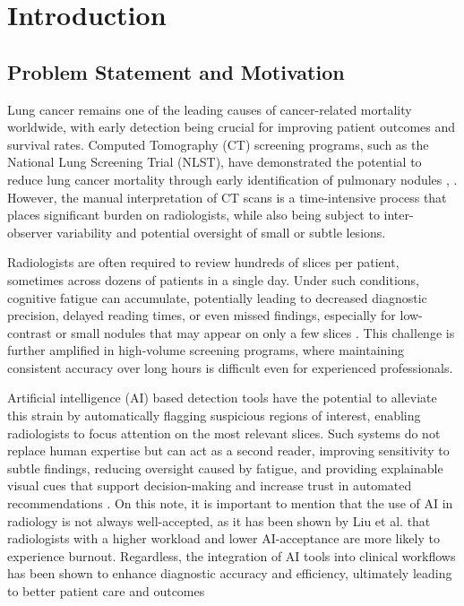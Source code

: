 \chapter{Introduction}
\label{ch:introduction}

\section{Problem Statement and Motivation}

Lung cancer remains one of the leading causes of cancer-related mortality worldwide, with early detection being crucial for improving patient outcomes and survival rates. Computed Tomography (CT) screening programs, such as the National Lung Screening Trial (NLST), have demonstrated the potential to reduce lung cancer mortality through early identification of pulmonary nodules \cite{aberle2011reduced}, \cite{de2020reduced}. However, the manual interpretation of CT scans is a time-intensive process that places significant burden on radiologists, while also being subject to inter-observer variability and potential oversight of small or subtle lesions.

Radiologists are often required to review hundreds of slices per patient, sometimes across dozens of patients in a single day. Under such conditions, cognitive fatigue can accumulate, potentially leading to decreased diagnostic precision, delayed reading times, or even missed findings, especially for low-contrast or small nodules that may appear on only a few slices \cite{stec2018systematic, taylor2019fatigue}. This challenge is further amplified in high-volume screening programs, where maintaining consistent accuracy over long hours is difficult even for experienced professionals.

Artificial intelligence (AI) based detection tools have the potential to alleviate this strain by automatically flagging suspicious regions of interest, enabling radiologists to focus attention on the most relevant slices. Such systems do not replace human expertise but can act as a second reader, improving sensitivity to subtle findings, reducing oversight caused by fatigue, and providing explainable visual cues that support decision-making and increase trust in automated recommendations \cite{glikson2020human}. 
On this note, it is important to mention that the use of AI in radiology is not always well-accepted, as it has been shown by Liu et al. \cite{liu2024artificial} that radiologists with a higher workload and lower AI-acceptance are more likely to experience burnout. Regardless, the integration of AI tools into clinical workflows has been shown to enhance diagnostic accuracy  and efficiency, ultimately leading to better patient care and outcomes \cite{guermazi2022improving,huynh2020artificial}

